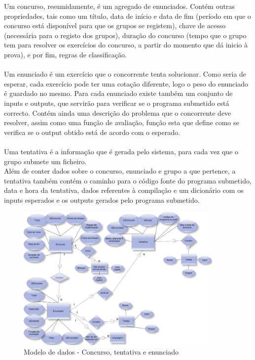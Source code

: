 Um concurso, resumidamente, é um agregado de enunciados. 
Contém outras propriedades, tais como um título, data de início e data de fim (período em que o concurso está disponível para que os grupos se registem), 
chave de acesso (necessária para o registo dos grupos), duração do concurso (tempo que o grupo tem para resolver os exercícios do concurso, 
a partir do momento que dá inicio à prova), e por fim, regras de classificação.\\
\\
Um enunciado é um exercício que o concorrente tenta solucionar. Como seria de esperar, cada exercício pode ter uma cotação diferente, 
logo o peso do enunciado é guardado no mesmo. 
Para cada enunciado existe também um conjunto de inputs e outputs, que servirão para verificar se o programa submetido está correcto. 
Contém ainda uma descrição do problema que o concorrente deve resolver, assim como uma função de avaliação, função esta que define como
 se verifica se o output obtido está de acordo com o esperado.\\
\\
Uma tentativa é a informação que é gerada pelo sistema, para cada vez que o grupo submete um ficheiro.\\
Além de conter dados sobre o concurso, enunciado e grupo a que pertence, a tentativa também contém o caminho para o código fonte do programa
submetido, data e hora da tentativa, dados referentes à compilação e um dicionário com os inputs esperados e os outputs gerados pelo programa
submetido.
\begin{figure}[htbp]
\begin{center}
\includegraphics[width=0.9\textwidth]{Images/concurso-enunciado}
\caption{Modelo de dados - Concurso, tentativa e enunciado}\label{fig modedados-conc-enunc}
\end{center}
\end{figure}

